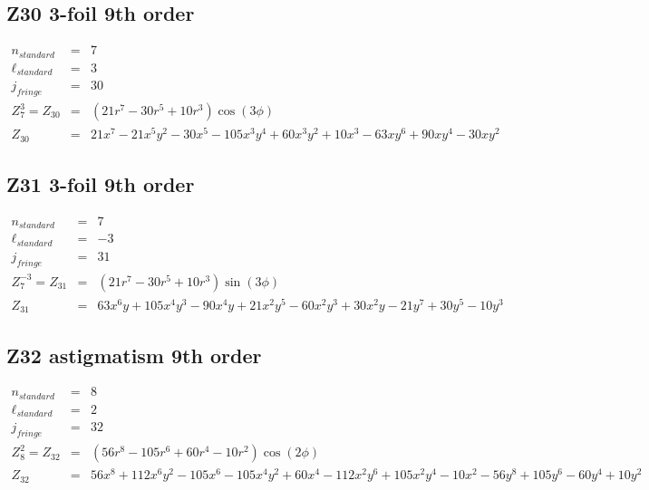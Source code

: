 \documentclass[10pt]{article}
\begin{document}
  \subsection{Z30 3-foil 9th order}
    \begin{subequations}
    \begin{eqnarray}
        n_{standard} &=&7\\
        \ell_{standard} &=&3\\
        j_{fringe} &=&30\\
        Z_{7}^{3} = Z_{30} &=& \left(21 r^{7} - 30 r^{5} + 10 r^{3}\right) \cos{\left(3 \phi \right)}\\
        Z_{30} &=& 21 x^{7} - 21 x^{5} y^{2} - 30 x^{5} - 105 x^{3} y^{4} + 60 x^{3} y^{2} + 10 x^{3} - 63 x y^{6} + 90 x y^{4} - 30 x y^{2}
    \end{eqnarray}
    \end{subequations}
  \subsection{Z31 3-foil 9th order}
    \begin{subequations}
    \begin{eqnarray}
        n_{standard} &=&7\\
        \ell_{standard} &=&-3\\
        j_{fringe} &=&31\\
        Z_{7}^{-3} = Z_{31} &=& \left(21 r^{7} - 30 r^{5} + 10 r^{3}\right) \sin{\left(3 \phi \right)}\\
        Z_{31} &=& 63 x^{6} y + 105 x^{4} y^{3} - 90 x^{4} y + 21 x^{2} y^{5} - 60 x^{2} y^{3} + 30 x^{2} y - 21 y^{7} + 30 y^{5} - 10 y^{3}
    \end{eqnarray}
    \end{subequations}
  \subsection{Z32 astigmatism 9th order}
    \begin{subequations}
    \begin{eqnarray}
        n_{standard} &=&8\\
        \ell_{standard} &=&2\\
        j_{fringe} &=&32\\
        Z_{8}^{2} = Z_{32} &=& \left(56 r^{8} - 105 r^{6} + 60 r^{4} - 10 r^{2}\right) \cos{\left(2 \phi \right)}\\
        Z_{32} &=& 56 x^{8} + 112 x^{6} y^{2} - 105 x^{6} - 105 x^{4} y^{2} + 60 x^{4} - 112 x^{2} y^{6} + 105 x^{2} y^{4} - 10 x^{2} - 56 y^{8} + 105 y^{6} - 60 y^{4} + 10 y^{2}
    \end{eqnarray}
    \end{subequations}
\end{document}
